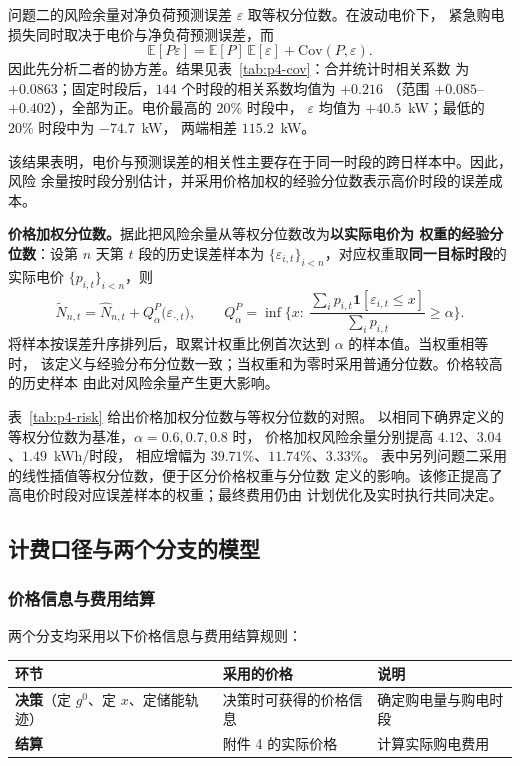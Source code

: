 问题二的风险余量对净负荷预测误差 $\varepsilon$ 取等权分位数。在波动电价下，
紧急购电损失同时取决于电价与净负荷预测误差，而
$$
\mathbb{E}[P\varepsilon]=\mathbb{E}[P]\,\mathbb{E}[\varepsilon]
+\mathrm{Cov}(P,\varepsilon).
$$
因此先分析二者的协方差。结果见表~\ref{tab:p4-cov}：合并统计时相关系数
为 $+0.0863$；固定时段后，$144$ 个时段的相关系数均值为 $+0.216$
（范围 $+0.085$--$+0.402$），全部为正。电价最高的 $20\%$ 时段中，
$\varepsilon$ 均值为 $+40.5$~kW；最低的 $20\%$ 时段中为 $-74.7$~kW，
两端相差 $115.2$~kW。

该结果表明，电价与预测误差的相关性主要存在于同一时段的跨日样本中。因此，风险
余量按时段分别估计，并采用价格加权的经验分位数表示高价时段的误差成本。

\textbf{价格加权分位数。}据此把风险余量从等权分位数改为\textbf{以实际电价为
权重的经验分位数}：设第 $n$ 天第 $t$ 段的历史误差样本为
$\{\varepsilon_{i,t}\}_{i<n}$，对应权重取\textbf{同一目标时段}的实际电价
$\{p_{i,t}\}_{i<n}$，则
$$
\widetilde N_{n,t}=\widehat N_{n,t}+Q^{P}_{\alpha}\big(\varepsilon_{\cdot,t}\big),
\qquad
Q^{P}_{\alpha}=\inf\Big\{x:\
\frac{\sum_{i}p_{i,t}\mathbf 1[\varepsilon_{i,t}\le x]}{\sum_i p_{i,t}}\ge
\alpha\Big\}.
$$
将样本按误差升序排列后，取累计权重比例首次达到 $\alpha$ 的样本值。当权重相等时，
该定义与经验分布分位数一致；当权重和为零时采用普通分位数。价格较高的历史样本
由此对风险余量产生更大影响。

表~\ref{tab:p4-risk} 给出价格加权分位数与等权分位数的对照。
以相同下确界定义的等权分位数为基准，$\alpha=0.6,0.7,0.8$ 时，
价格加权风险余量分别提高 $4.12$、$3.04$、$1.49$~kWh/时段，
相应增幅为 $39.71\%$、$11.74\%$、$3.33\%$。
表中另列问题二采用的线性插值等权分位数，便于区分价格权重与分位数
定义的影响。该修正提高了高电价时段对应误差样本的权重；最终费用仍由
计划优化及实时执行共同决定。

\subsection{计费口径与两个分支的模型}
\label{sec:p4-model}

\subsubsection{价格信息与费用结算}

两个分支均采用以下价格信息与费用结算规则：

\begin{center}
\small
\begin{tabular}{lll}
  \toprule
  环节 & 采用的价格 & 说明 \\
  \midrule
  \textbf{决策}（定 $g^0$、定 $x$、定储能轨迹）
    & 决策时可获得的价格信息 & 确定购电量与购电时段 \\
  \textbf{结算}
    & 附件 4 的实际价格 & 计算实际购电费用 \\
  \bottomrule
\end{tabular}
\end{center}

